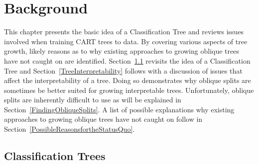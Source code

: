 \chapter{Background}
\label{Background}
This chapter presents the basic idea of a Classification Tree and reviews issues involved when training CART trees to data. By covering various aspects of tree growth, likely reasons as to why existing approaches to growing oblique trees have not caught on are identified. Section~\ref{ClassificationTrees} revisits the idea of a Classification Tree and Section~\ref{TreeInterpretability} follows with a discussion of issues that affect the interpretability of a tree. Doing so demonstrates why oblique splits are sometimes be better suited for growing interpretable trees. Unfortunately, oblique splits are inherently difficult to use as will be explained in Section~\ref{FindingObliqueSplits}. A list of possible explanations why existing approaches to growing oblique trees have not caught on follow in Section~\ref{PossibleReasonsfortheStatusQuo}.

\section{Classification Trees}
\label{ClassificationTrees}
